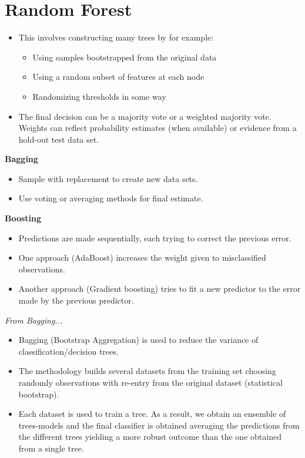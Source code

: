 \section{Random Forest}
\begin{itemize}
    \item This involves constructing many trees by for example:
          \begin{itemize}
              \item Using samples bootstrapped from the original data
              \item Using a random subset of features at each node
              \item Randomizing thresholds in some way
          \end{itemize}
    \item The final decision can be a majority vote or a weighted majority vote. Weights can reflect probability estimates (when available) or evidence from a hold-out test data set.
\end{itemize}

\textbf{Bagging}
\begin{itemize}
    \item Sample with replacement to create new data sets.
    \item Use voting or averaging methods for final estimate.
\end{itemize}

\textbf{Boosting}
\begin{itemize}
    \item Predictions are made sequentially, each trying to correct the previous error.
    \item One approach (AdaBoost) increases the weight given to misclassified observations.
    \item Another approach (Gradient boosting) tries to fit a new predictor to the error made by the previous predictor.
\end{itemize}

\textit{From Bagging...}
\begin{itemize}
    \item Bagging (Bootstrap Aggregation) is used to reduce the variance of classification/decision trees.
    \item The methodology builds several datasets from the training set choosing randomly observations with re-entry from the original dataset (statistical bootstrap).
    \item Each dataset is used to train a tree. As a result, we obtain an ensemble of trees-models and the final classifier is obtained averaging the predictions from the different trees yielding a more robust outcome than the one obtained from a single tree.
\end{itemize}

